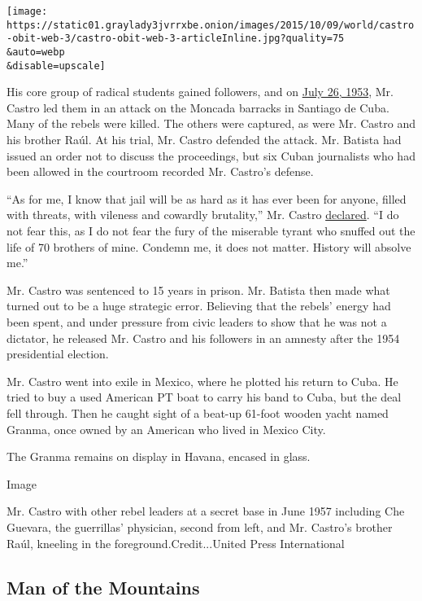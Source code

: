 \texttt{[image: https://static01.graylady3jvrrxbe.onion/images/2015/10/09/world/castro-obit-web-3/castro-obit-web-3-articleInline.jpg?quality=75\\\&auto=webp\\\&disable=upscale]}

His core group of radical students gained followers, and on
\href{http://query.nytimes3xbfgragh.onion/mem/archive-free/pdf?res=9806E6D81F3DE03ABC4F51DFB1668388649EDE}{July
26, 1953}, Mr. Castro led them in an attack on the Moncada barracks in
Santiago de Cuba. Many of the rebels were killed. The others were
captured, as were Mr. Castro and his brother Raúl. At his trial, Mr.
Castro defended the attack. Mr. Batista had issued an order not to
discuss the proceedings, but six Cuban journalists who had been allowed
in the courtroom recorded Mr. Castro's defense.

``As for me, I know that jail will be as hard as it has ever been for
anyone, filled with threats, with vileness and cowardly brutality,'' Mr.
Castro
\href{https://www.marxists.org/history/cuba/archive/castro/1953/10/16.htm}{declared}.
``I do not fear this, as I do not fear the fury of the miserable tyrant
who snuffed out the life of 70 brothers of mine. Condemn me, it does not
matter. History will absolve me.''

Mr. Castro was sentenced to 15 years in prison. Mr. Batista then made
what turned out to be a huge strategic error. Believing that the rebels'
energy had been spent, and under pressure from civic leaders to show
that he was not a dictator, he released Mr. Castro and his followers in
an amnesty after the 1954 presidential election.

Mr. Castro went into exile in Mexico, where he plotted his return to
Cuba. He tried to buy a used American PT boat to carry his band to Cuba,
but the deal fell through. Then he caught sight of a beat-up 61-foot
wooden yacht named Granma, once owned by an American who lived in Mexico
City.

The Granma remains on display in Havana, encased in glass.

Image

Mr. Castro with other rebel leaders at a secret base in June 1957
including Che Guevara, the guerrillas' physician, second from left, and
Mr. Castro's brother Raúl, kneeling in the foreground.Credit...United
Press International

\hypertarget{man-of-the-mountains}{%
\subsection{Man of the Mountains}\label{man-of-the-mountains}}

